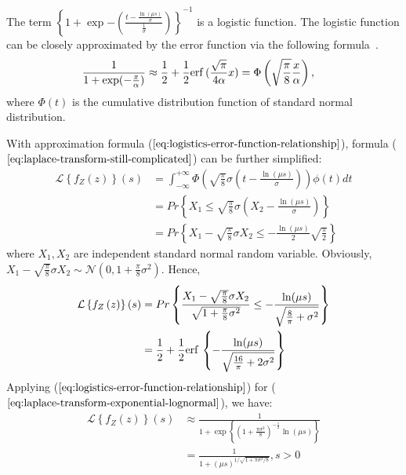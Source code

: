The term $\left\lbrace 1+\exp{-\left( \frac{t-\frac{\ln(\mu s)}{\sigma}}{\frac{1}{\sigma}}\right) }\right\rbrace ^{-1}$ is a logistic function. The logistic function can be closely approximated by the error function via the following formula~\cite{crooks2009logistic}.
\begin{align}
\label{eq:logistics-error-function-relationship}
\frac{1}{1 + \exp(-\frac{x}{\alpha})}
&\approx \frac{1}{2} + \frac{1}{2}\mathrm{erf}\,(\frac{\sqrt{\pi}}{4\alpha}x) 
= \Phi\left( \sqrt{\frac{\pi}{8}} \frac{x}{\alpha} \right),
\end{align}
where $\Phi\left( t \right)$ is the cumulative distribution function of standard normal distribution. 

With approximation formula ($\ref{eq:logistics-error-function-relationship}$), formula ($\ref{eq:laplace-transform-still-complicated}$) can be further simplified:
\begin{align*}
\mathcal{L}\left\lbrace f_Z\left( z\right) \right\rbrace \left(  s\right)
&= \int_{-\infty}^{+\infty} \Phi\left( \sqrt{\frac{\pi}{8}}\sigma\left( t-\frac{\ln(\mu s)}{\sigma}\right) \right) \phi\left( t \right) dt \\ 
&= Pr \left\lbrace X_1 \leq \sqrt{\frac{\pi}{8}}\sigma\left( X_2-\frac{\ln(\mu s)}{\sigma}\right) \right\rbrace \\
&= Pr \left\lbrace X_1 - \sqrt{\frac{\pi}{8}}\sigma X_2 \leq -\frac{\ln(\mu s)}{2} \sqrt{\frac{\pi}{2}} \right\rbrace 
\end{align*}
where $X_1, X_2$ are independent standard normal random variable. Obviously, $X_1 - \sqrt{\frac{\pi}{8}}\sigma X_2 \sim \mathcal{N}\left( 0,  1+ \frac{\pi}{8}\sigma^2\right) $. Hence,
\begin{align}
\label{eq:laplace-transform-exponential-lognormal}
\mathcal{L}\left\lbrace f_Z\left( z\right) \right\rbrace \left(  s\right)   &= Pr \left\lbrace \frac{X_1 - \sqrt{\frac{\pi}{8}}\sigma X_2}{\sqrt{1+ \frac{\pi}{8}\sigma^2}} \leq -\frac{\ln(\mu s)}{\sqrt{\frac{8}{\pi}+ \sigma^2}} \right\rbrace  \nonumber\\
&= \frac{1}{2} + \frac{1}{2} \mathrm{erf}\, \left\lbrace -\frac{\ln(\mu s)}{\sqrt{\frac{16}{\pi}+ 2\sigma^2}} \right\rbrace 
\end{align}
Applying ($\ref{eq:logistics-error-function-relationship}$) for ($\ref{eq:laplace-transform-exponential-lognormal}$), we have:
\begin{align*}
\mathcal{L}\left\lbrace f_Z\left( z\right) \right\rbrace \left(  s\right)   &\approx \frac{1}{1 + \exp\left\lbrace \left( 1 +\frac{\pi \sigma^2}{8} \right)^{-\frac{1}{2}} \ln(\mu s) \right\rbrace} \\
&= \frac{1}{1 + (\mu s)^{1/\sqrt{1 +\pi \sigma^2/8}}}, s > 0
\end{align*}

